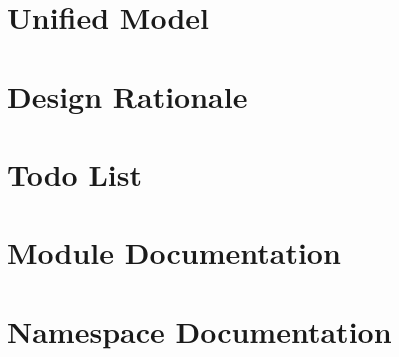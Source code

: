 \documentclass[twoside]{article}
\newcommand{\+}{\discretionary{\mbox{\scriptsize$\hookleftarrow$}}{}{}}
\begin{document}
\section{Unified Model}
\label{page_unified_model}
\hypertarget{page_unified_model}{}

\section{Design Rationale}
\label{page_design}
\hypertarget{page_design}{}

\section{Todo List}
\label{todo}
\hypertarget{todo}{}

\section{Module Documentation}












\section{Namespace Documentation}


\end{document}
